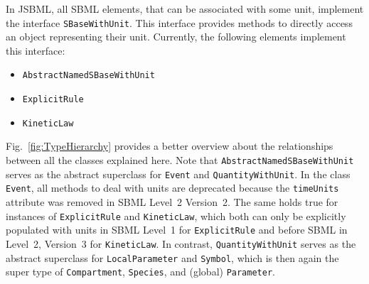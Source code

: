In JSBML, all SBML elements, that can be associated with some unit, implement
the interface \texttt{SBaseWithUnit}.
%
This interface provides methods to directly
access an object representing their unit. Currently, the following elements
implement this interface:
\begin{itemize}
 \item \texttt{AbstractNamedSBaseWithUnit}
 \item \texttt{ExplicitRule}
 \item \texttt{KineticLaw}
\end{itemize}
Fig.~\vref{fig:TypeHierarchy} provides a better overview about the relationships
between all the classes explained here. Note that
\texttt{AbstractNamedSBaseWithUnit} serves as the abstract superclass for
\texttt{Event} and \texttt{QuantityWithUnit}.
%
In the class \texttt{Event}, all methods
to deal with units are deprecated because the \texttt{timeUnits} attribute
was removed in SBML Level~2 Version~2. The same holds true
for instances of
\texttt{ExplicitRule}
and \texttt{KineticLaw},
which both can only be explicitly populated with units in SBML
Level~1 for \texttt{ExplicitRule} and before SBML in
Level~2, Version~3 for \texttt{KineticLaw}. In contrast,
\texttt{QuantityWithUnit}
%
serves as the abstract superclass for \texttt{LocalParameter}
%
and \texttt{Symbol},
%
which is then again the super type of \texttt{Compartment}, \texttt{Species},
and (global) \texttt{Parameter}.
%
%
%


